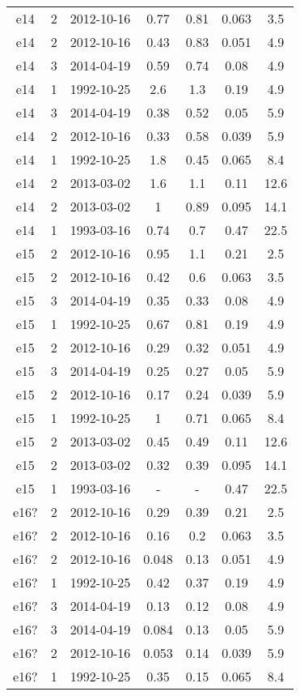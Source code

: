 \begin{longtable}[htp]
\begin{longtable}{ccccccc}
e14 & 2 & 2012-10-16 & 0.77 & 0.81 & 0.063 & 3.5 \\
e14 & 2 & 2012-10-16 & 0.43 & 0.83 & 0.051 & 4.9 \\
e14 & 3 & 2014-04-19 & 0.59 & 0.74 & 0.08 & 4.9 \\
e14 & 1 & 1992-10-25 & 2.6 & 1.3 & 0.19 & 4.9 \\
e14 & 3 & 2014-04-19 & 0.38 & 0.52 & 0.05 & 5.9 \\
e14 & 2 & 2012-10-16 & 0.33 & 0.58 & 0.039 & 5.9 \\
e14 & 1 & 1992-10-25 & 1.8 & 0.45 & 0.065 & 8.4 \\
e14 & 2 & 2013-03-02 & 1.6 & 1.1 & 0.11 & 12.6 \\
e14 & 2 & 2013-03-02 & 1 & 0.89 & 0.095 & 14.1 \\
e14 & 1 & 1993-03-16 & 0.74 & 0.7 & 0.47 & 22.5 \\
e15 & 2 & 2012-10-16 & 0.95 & 1.1 & 0.21 & 2.5 \\
e15 & 2 & 2012-10-16 & 0.42 & 0.6 & 0.063 & 3.5 \\
e15 & 3 & 2014-04-19 & 0.35 & 0.33 & 0.08 & 4.9 \\
e15 & 1 & 1992-10-25 & 0.67 & 0.81 & 0.19 & 4.9 \\
e15 & 2 & 2012-10-16 & 0.29 & 0.32 & 0.051 & 4.9 \\
e15 & 3 & 2014-04-19 & 0.25 & 0.27 & 0.05 & 5.9 \\
e15 & 2 & 2012-10-16 & 0.17 & 0.24 & 0.039 & 5.9 \\
e15 & 1 & 1992-10-25 & 1 & 0.71 & 0.065 & 8.4 \\
e15 & 2 & 2013-03-02 & 0.45 & 0.49 & 0.11 & 12.6 \\
e15 & 2 & 2013-03-02 & 0.32 & 0.39 & 0.095 & 14.1 \\
e15 & 1 & 1993-03-16 & - & - & 0.47 & 22.5 \\
e16? & 2 & 2012-10-16 & 0.29 & 0.39 & 0.21 & 2.5 \\
e16? & 2 & 2012-10-16 & 0.16 & 0.2 & 0.063 & 3.5 \\
e16? & 2 & 2012-10-16 & 0.048 & 0.13 & 0.051 & 4.9 \\
e16? & 1 & 1992-10-25 & 0.42 & 0.37 & 0.19 & 4.9 \\
e16? & 3 & 2014-04-19 & 0.13 & 0.12 & 0.08 & 4.9 \\
e16? & 3 & 2014-04-19 & 0.084 & 0.13 & 0.05 & 5.9 \\
e16? & 2 & 2012-10-16 & 0.053 & 0.14 & 0.039 & 5.9 \\
e16? & 1 & 1992-10-25 & 0.35 & 0.15 & 0.065 & 8.4 \\

\end{longtable}
\end{longtable}
